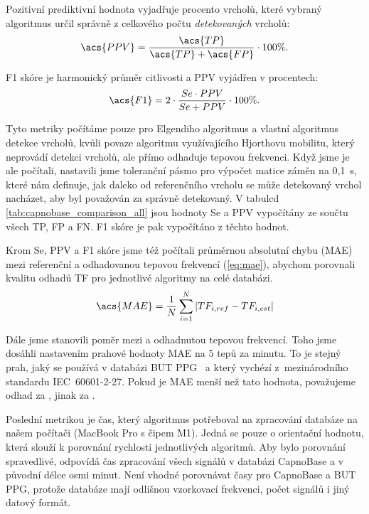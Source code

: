 Pozitivní prediktivní hodnota vyjadřuje procento vrcholů, které vybraný algoritmus určil správně z celkového počtu \textit{detekovaných} vrcholů:
\begin{equation}
	\label{eq:ppv}
	\acs{PPV} = \frac{\acs{TP}}{\acs{TP} + \acs{FP}} \cdot 100\%.
\end{equation}

\acs{F1} skóre je harmonický průměr citlivosti a \acs{PPV} vyjádřen v procentech:
\begin{equation}
	\label{eq:f1}
	\acs{F1} = 2 \cdot \frac{Se \cdot PPV}{Se + PPV} \cdot 100\%.
\end{equation}

Tyto metriky počítáme pouze pro Elgendiho algoritmus a vlastní algoritmus detekce vrcholů, kvůli povaze algoritmu využívajícího Hjorthovu mobilitu, který neprovádí detekci vrcholů, ale přímo odhaduje tepovou frekvenci.
Když jsme je ale počítali, nastavili jsme toleranční pásmo pro výpočet matice záměn na 0,1~\acs{s}, které nám definuje, jak daleko od referenčního vrcholu se může detekovaný vrchol nacházet, aby byl považován za správně detekovaný.
V tabulcd \ref{tab:capnobase_comparison_all} jsou hodnoty \acs{Se} a \acs{PPV} vypočítány ze součtu všech \acs{TP}, \acs{FP} a \acs{FN}.
\acs{F1} skóre je pak vypočítáno z těchto hodnot.

Krom \acs{Se}, \acs{PPV} a \acs{F1} skóre jsme též počítali průměrnou absolutní chybu (\acs{MAE}) mezi referenční a odhadovanou tepovou frekvencí (\ref{eq:mae}), abychom porovnali kvalitu odhadů \acs{TF} pro jednotlivé algoritmy na celé databázi.
\begin{equation}
	\label{eq:mae}
	\acs{MAE} = \frac{1}{N} \sum_{i=1}^{N} |TF_{i,ref} - TF_{i,est}|
\end{equation}

Dále jsme stanovili poměr mezi  a  odhadnutou tepovou frekvencí.
Toho jsme dosáhli nastavením prahové hodnoty \acs{MAE} na 5 tepů za minutu.
To je stejný prah, jaký se používá v databázi \acs{BUT PPG}~\cite{BUT_PPG} a který vychézí z~mezinárodního standardu IEC~60601-2-27.
Pokud je \acs{MAE} menší než tato hodnota, považujeme odhad za , jinak za .

Poslední metrikou je čas, který algoritmus potřeboval na zpracování databáze na našem počítači (MacBook Pro s čipem M1).
Jedná se pouze o orientační hodnotu, která slouží k porovnání rychlosti jednotlivých algoritmů.
Aby bylo porovnání spravedlivé, odpovídá čas zpracování všech signálů v databázi CapnoBase a v původní délce osmi minut.
Není vhodné porovnávat časy pro CapnoBase a \acs{BUT PPG}, protože databáze mají odlišnou vzorkovací frekvenci, počet signálů i jiný datový formát.

